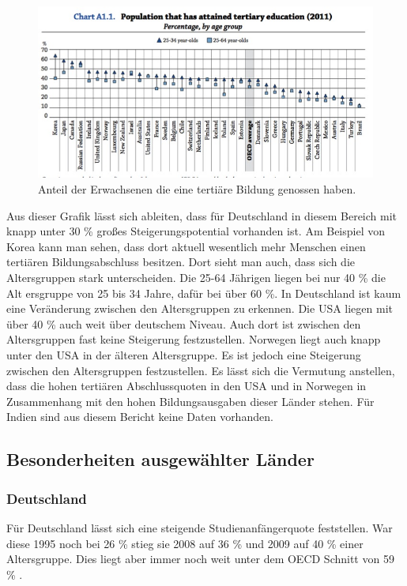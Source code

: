 \begin{figure}[H]
\includegraphics[width=15cm]{./images/tertiary.jpg}
\center
\caption{Anteil der Erwachsenen die eine tertiäre Bildung genossen haben. \cite[26]{oecd5} }
\end{figure}
Aus dieser Grafik lässt sich ableiten, dass für Deutschland in diesem Bereich mit knapp unter 30 \% großes Steigerungspotential vorhanden ist.
Am Beispiel von Korea kann man sehen, dass dort aktuell wesentlich mehr Menschen einen tertiären Bildungsabschluss besitzen. Dort sieht man auch, dass sich die Altersgruppen stark unterscheiden. Die 25-64 Jährigen liegen bei nur 40 \% die Alt	ersgruppe von 25 bis 34 Jahre, dafür bei über 60 \%. In Deutschland ist kaum eine Veränderung zwischen den Altersgruppen zu erkennen.
Die USA liegen mit über 40 \% auch weit über deutschem Niveau. Auch dort ist zwischen den Altersgruppen fast keine Steigerung festzustellen.
Norwegen liegt auch knapp unter den USA in der älteren Altersgruppe.  Es ist jedoch eine Steigerung zwischen den Altersgruppen festzustellen. Es lässt sich die Vermutung anstellen, dass die hohen tertiären Abschlussquoten in den USA und in Norwegen in Zusammenhang mit den hohen Bildungsausgaben dieser Länder stehen.
Für Indien sind aus diesem Bericht keine Daten vorhanden.

\subsection*{Besonderheiten ausgewählter Länder}
\subsubsection*{Deutschland}
Für Deutschland lässt sich eine steigende Studienanfängerquote feststellen. War diese 1995 noch bei 26 \%  stieg sie 2008 auf 36 \%  und 2009 auf 40 \% einer Altersgruppe. Dies liegt aber immer noch  weit unter dem OECD Schnitt von 59 \% .

